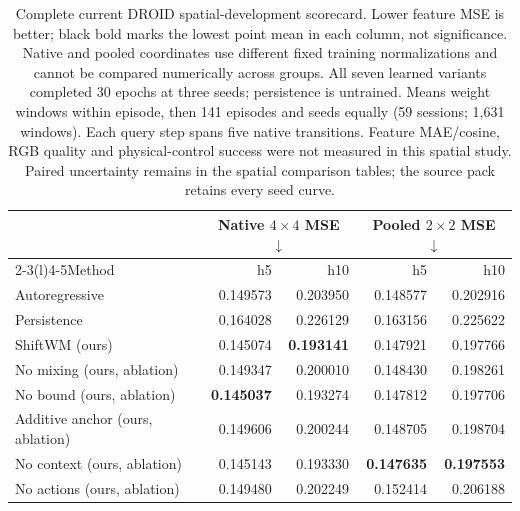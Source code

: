 \begin{table}[!htb]\centering
\caption{Complete current DROID spatial-development scorecard. Lower feature MSE is better; black bold marks the lowest point mean in each column, not significance. Native and pooled coordinates use different fixed training normalizations and cannot be compared numerically across groups. All seven learned variants completed 30 epochs at three seeds; persistence is untrained. Means weight windows within episode, then 141 episodes and seeds equally (59 sessions; 1,631 windows). Each query step spans five native transitions. Feature MAE/cosine, RGB quality and physical-control success were not measured in this spatial study. Paired uncertainty remains in the spatial comparison tables; the source pack retains every seed curve.}
\label{tab:spatial-native}\label{tab:spatial-pooled}\label{tab:current-droid-scorecard}
\begingroup\fontsize{9}{10.8}\selectfont\setlength{\tabcolsep}{3.5pt}\renewcommand{\arraystretch}{1.13}
\begin{tabular}{@{}lrrrr@{}}\toprule
& \multicolumn{2}{c}{Native $4\times4$ MSE $\downarrow$} & \multicolumn{2}{c}{Pooled $2\times2$ MSE $\downarrow$} \\
\cmidrule(lr){2-3}\cmidrule(l){4-5}Method & h5 & h10 & h5 & h10 \\ \midrule
Autoregressive & 0.149573 & 0.203950 & 0.148577 & 0.202916 \\
Persistence & 0.164028 & 0.226129 & 0.163156 & 0.225622 \\
ShiftWM (ours) & 0.145074 & \textbf{0.193141} & 0.147921 & 0.197766 \\
No mixing (ours, ablation) & 0.149347 & 0.200010 & 0.148430 & 0.198261 \\
No bound (ours, ablation) & \textbf{0.145037} & 0.193274 & 0.147812 & 0.197706 \\
Additive anchor (ours, ablation) & 0.149606 & 0.200244 & 0.148705 & 0.198704 \\
No context (ours, ablation) & 0.145143 & 0.193330 & \textbf{0.147635} & \textbf{0.197553} \\
No actions (ours, ablation) & 0.149480 & 0.202249 & 0.152414 & 0.206188 \\
\bottomrule\end{tabular}\endgroup\end{table}
